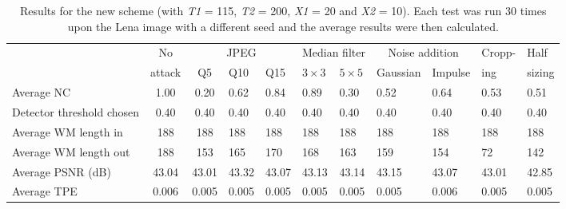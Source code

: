 \documentclass[10pt,twocolumn]{article}
\begin{document}
\begin{table*}[!t]
\begin{center}
\begin{scriptsize}
\begin{tabular}{|p{2.75cm}|c|c|p{0.9cm}|p{0.9cm}|p{0.9cm}|p{0.9cm}|p{0.9cm}|p{0.9cm}|p{0.9cm}|p{0.9cm}|} \hline

& No &\multicolumn{3}{|c|}{JPEG} & \multicolumn{2}{|c|}{Median filter} 
	& \multicolumn{2}{|c|}{Noise addition} & Cropp- & Half \\ \cline{3-9} %
& attack  & Q5 & Q10 & Q15 & $3 \times 3$ & $5 \times 5$ 
	& Gaussian & Impulse & ing & sizing \\ \hline %
Average NC & 1.00 & 0.20 & 0.62& 0.84 & 0.89& 0.30& 0.52& 0.64& 0.53& 0.51\\ \hline %
Detector threshold chosen & 0.40 & 0.40 & 0.40 & 0.40 & 0.40 & 0.40 & 0.40 & 0.40 & 0.40 & 0.40   \\ \hline
Average WM length in & 188 & 188 & 188 & 188 & 188 & 188 & 188 & 188 & 188 & 188 \\ \hline %
Average WM length out & 188 & 153 & 165 & 170 & 168 & 163& 159& 154& 72& 142\\ \hline %
Average PSNR (dB) &  43.04 & 43.01 & 43.32 & 43.07 & 43.13 & 43.14& 43.15& 43.07& 43.01& 42.85\\ \hline %
Average TPE & 0.006 & 0.005 & 0.005 & 0.005 & 0.005& 0.005& 0.005& 0.006& 0.005& 0.005\\ \hline %
\end{tabular}
\end{scriptsize}
\end{center}
\caption{Results for the new scheme (with \emph{T1} = 115, \emph{T2} = 200, \emph{X1} = 20 and \emph{X2} = 10). Each test was run
	30 times upon the Lena image with a different seed and the average results were then calculated.}
\label{ourResults}
\end{table*}
\end{document}
